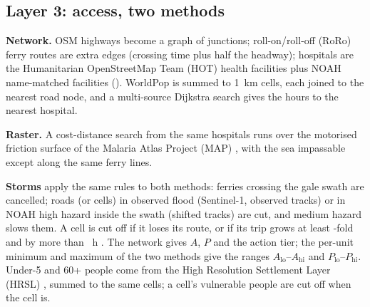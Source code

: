 \subsection{Layer 3: access, two methods}

\textbf{Network.} OSM highways become a graph of junctions; roll-on/roll-off (RoRo) ferry routes are extra edges (crossing time plus half the headway); hospitals are the Humanitarian OpenStreetMap Team (HOT) health facilities plus NOAH name-matched facilities (\nHosp{}). WorldPop is summed to 1~km cells, each joined to the nearest road node, and a multi-source Dijkstra search gives the hours to the nearest hospital.

\textbf{Raster.} A cost-distance search from the same hospitals runs over the motorised friction surface of the Malaria Atlas Project (MAP) \parencite{weiss2020}, with the sea impassable except along the same ferry lines.

\textbf{Storms} apply the same rules to both methods: ferries crossing the gale swath are cancelled; roads (or cells) in observed flood (Sentinel-1, observed tracks) or in NOAH high hazard inside the swath (shifted tracks) are cut, and medium hazard slows them. A cell is cut off if it loses its route, or if its trip grows at least \cutRatio{}-fold and by more than \cutExtraH{}~h \parencite[after][]{petricola2022}. The network gives $A$, $P$ and the action tier; the per-unit minimum and maximum of the two methods give the ranges $A_{\text{lo}}$--$A_{\text{hi}}$ and $P_{\text{lo}}$--$P_{\text{hi}}$. Under-5 and 60+ people come from the High Resolution Settlement Layer (HRSL) \parencite{tiecke2017}, summed to the same cells; a cell's vulnerable people are cut off when the cell is.

